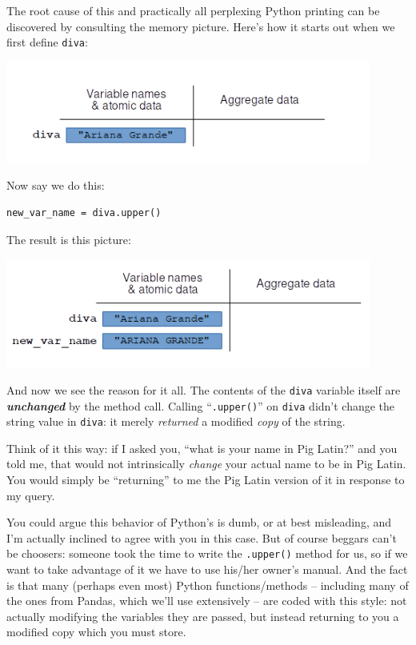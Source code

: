 The root cause of this and practically all perplexing Python printing can be
discovered by consulting the memory picture. Here's how it starts out when we
first define \texttt{diva}:

\vspace{-.2in}
\begin{center}
\includegraphics[width=0.9\textwidth]{bomb.png}
\end{center}

Now say we do this:

\begin{Verbatim}[fontsize=\small,samepage=true,frame=single,framesep=3mm]
new_var_name = diva.upper()
\end{Verbatim}

The result is this picture:

\vspace{-.2in}
\begin{center}
\includegraphics[width=0.9\textwidth]{bomb2.png}
\end{center}

And now we see the reason for it all. The contents of the \texttt{diva}
variable itself are \textit{\textbf{unchanged}} by the method call. Calling
``\texttt{.upper()}'' on \texttt{diva} didn't change the string value in
\texttt{diva}: it merely \textit{returned} a modified \textit{copy} of the
string.

Think of it this way: if I asked you, ``what is your name in Pig Latin?'' and
you told me, that would not intrinsically \textit{change} your actual name to
be in Pig Latin. You would simply be ``returning'' to me the Pig Latin version
of it in response to my query.

You could argue this behavior of Python's is dumb, or at best misleading, and
I'm actually inclined to agree with you in this case. But of course beggars
can't be choosers: someone took the time to write the \texttt{.upper()} method
for us, so if we want to take advantage of it we have to use his/her owner's
manual. And the fact is that many (perhaps even most) Python functions/methods
-- including many of the ones from Pandas, which we'll use extensively -- are
coded with this style: not actually modifying the variables they are passed,
but instead returning to you a modified copy which you must store.

